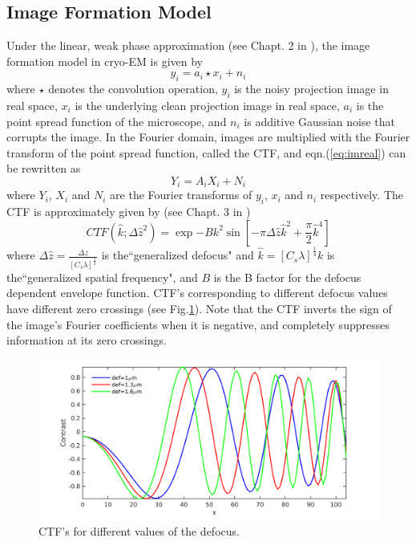 \documentclass{article}
\begin{document}
\subsection{Image Formation Model}
Under the linear, weak phase approximation (see Chapt. 2 in \cite{frankbook}), the image formation model in cryo-EM is given by
\begin{equation}
y_i = a_i\star x_i + n_i
\label{eq:imreal}
\end{equation}
where $\star$ denotes the convolution operation, $y_i$ is the noisy projection image in real space, $x_i$ is the underlying clean projection image in real space, $a_i$ is the point spread function of the microscope, and $n_i$ is additive Gaussian noise that corrupts the image. In the Fourier domain, images are multiplied with the Fourier transform of the point spread function, called the CTF, and eqn.(\ref{eq:imreal}) can be rewritten as
\begin{equation}
Y_i = A_iX_i + N_i
\label{eq:imfour}
\end{equation}
where $Y_i$, $X_i$ and $N_i$ are the Fourier transforms of $y_i$, $x_i$ and $n_i$ respectively.
The CTF is approximately  given by (see Chapt. 3 in \cite{frankbook})
\begin{equation}
CTF(\hat{k};\Delta\hat{z}^2)= \exp{-Bk^2}\sin[-\pi \Delta\hat{z}\hat{k}^2 + \frac{\pi}{2} \hat{k}^4]
\label{eq:ctf}
\end{equation}
where 
$\Delta\hat{z}=\frac{\Delta z}{[C_s \lambda]^{\frac{1}{2}}}$ is the``generalized defocus" and $\hat{k}=[C_s \lambda]^{\frac{1}{4}}k$ is the``generalized spatial frequency", and $B$ is the B factor for the defocus dependent envelope function. CTF's corresponding to different defocus values have different zero crossings (see Fig.\ref{fig:ctf}). Note that the CTF inverts the sign of the image's Fourier coefficients when it is negative, and completely suppresses information at its zero crossings.

\begin{figure}
\begin{center}
\includegraphics[scale=0.4]{ctfeg_fig.png}
\caption{CTF's for different values of the defocus.}\label{fig:ctf}
\end{center}

\end{figure}
\end{document}

